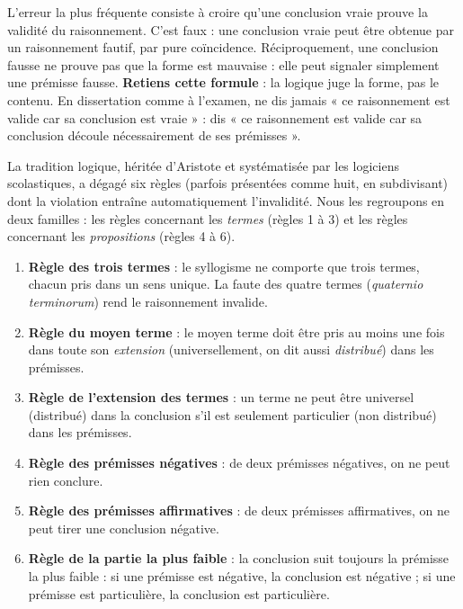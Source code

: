 \documentclass[11pt]{article}
\newcommand{\cle}[1]{{\popxbold\color{popdark}#1}}
\newcounter{popsec}
\newcounter{popsub}
\newcommand{\courssub}[1]{%
  \stepcounter{popsub}%
  \par\vspace{9pt}\noindent{\popxbold\fontsize{11.5}{13}\selectfont\color{popink}{\color{poporange}\thepopsec.\thepopsub}\hspace{6pt}#1}\par\nopagebreak\vspace{4pt}
}
\begin{document}
\begin{attention}
L'erreur la plus fréquente consiste à croire qu'une conclusion vraie prouve la validité du raisonnement. C'est faux : une conclusion vraie peut être obtenue par un raisonnement fautif, par pure coïncidence. Réciproquement, une conclusion fausse ne prouve pas que la forme est mauvaise : elle peut signaler simplement une prémisse fausse. \textbf{Retiens cette formule} : la logique juge la \cle{forme}, pas le \cle{contenu}. En dissertation comme à l'examen, ne dis jamais « ce raisonnement est valide car sa conclusion est vraie » : dis « ce raisonnement est valide car sa conclusion découle nécessairement de ses prémisses ».
\end{attention}

\courssub{Les six règles de validité}

La tradition logique, héritée d'Aristote et systématisée par les logiciens scolastiques, a dégagé six règles (parfois présentées comme huit, en subdivisant) dont la violation entraîne automatiquement l'invalidité. Nous les regroupons en deux familles : les règles concernant les \emph{termes} (règles 1 à 3) et les règles concernant les \emph{propositions} (règles 4 à 6).

\begin{propriete}
\begin{enumerate}
\item \textbf{Règle des trois termes} : le syllogisme ne comporte que trois termes, chacun pris dans un sens unique. La faute des quatre termes (\emph{quaternio terminorum}) rend le raisonnement invalide.
\item \textbf{Règle du moyen terme} : le moyen terme doit être pris au moins une fois dans toute son \emph{extension} (universellement, on dit aussi \emph{distribué}) dans les prémisses.
\item \textbf{Règle de l'extension des termes} : un terme ne peut être universel (distribué) dans la conclusion s'il est seulement particulier (non distribué) dans les prémisses.
\item \textbf{Règle des prémisses négatives} : de deux prémisses négatives, on ne peut rien conclure.
\item \textbf{Règle des prémisses affirmatives} : de deux prémisses affirmatives, on ne peut tirer une conclusion négative.
\item \textbf{Règle de la partie la plus faible} : la conclusion suit toujours la prémisse la plus faible : si une prémisse est négative, la conclusion est négative ; si une prémisse est particulière, la conclusion est particulière.
\end{enumerate}
\end{propriete}
\end{document}
